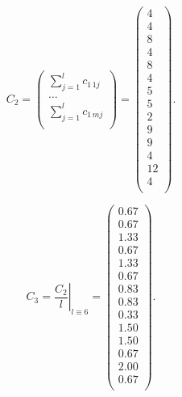 \begin{equation}\label{eq:matrix_c2}
    C_2 = \begin{pmatrix}
        \sum_{j=1}^l c_{1\,1j} \\
        \ldots \\
        \sum_{j=1}^l c_{1\,mj} \\
    \end{pmatrix} 
    =
    \begin{pmatrix}
        4 \\
        4 \\
        8 \\
        4 \\
        8 \\
        4 \\
        5 \\
        5 \\
        2 \\
        9 \\
        9 \\
        4 \\
        12 \\
        4 \\
    \end{pmatrix}.
\end{equation}


\begin{equation}\label{eq:matrix_c3}
    C_3 = \left. \frac{C_2}{l} \right|_{l \equiv 6} = 
    \begin{pmatrix}
        0.67 \\
        0.67 \\
        1.33 \\
        0.67 \\
        1.33 \\
        0.67 \\
        0.83 \\
        0.83 \\
        0.33 \\
        1.50 \\
        1.50 \\
        0.67 \\
        2.00 \\
        0.67 \\
    \end{pmatrix}.
\end{equation}


